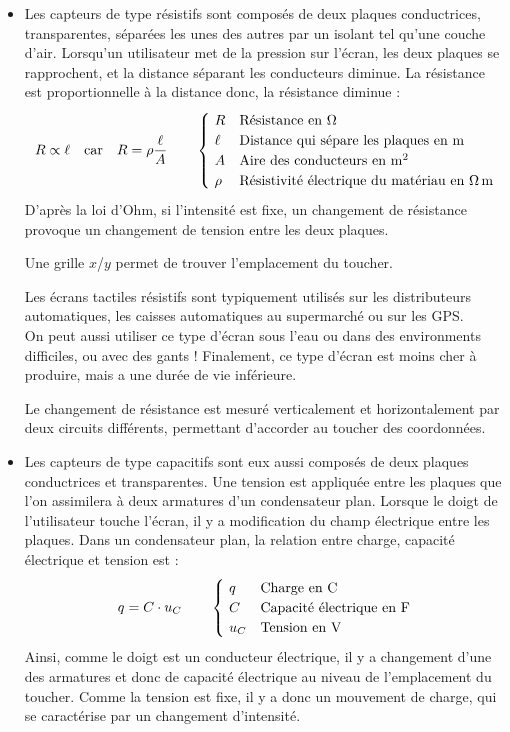 \documentclass[DIV=12]{scrartcl}
\begin{document}
   \begin{itemize}
        \item Les capteurs de type résistifs sont composés de deux plaques conductrices, transparentes, séparées les unes des autres par un isolant tel qu'une couche d'air.
        Lorsqu'un utilisateur met de la pression sur l'écran, les deux plaques se rapprochent, et la distance séparant les conducteurs diminue. La résistance est proportionnelle à la distance donc, la résistance diminue : \[R\propto\ell\quad\text{car}\quad R=\rho\frac{\ell}{A}\qquad\begin{cases}~R&\text{Résistance en \si{\ohm}}\\~\ell&\text{Distance qui sépare les plaques en \si{\metre}}\\~A&\text{Aire des conducteurs en \si{\metre\squared}}\\~\rho&\text{Résistivité électrique du matériau en \si{\ohm\meter}}\end{cases}\]
        D'après la loi d'Ohm, si l'intensité est fixe, un changement de résistance provoque  un changement de tension entre les deux plaques.

        Une grille $x$/$y$ permet de trouver l'emplacement du toucher.

        Les écrans tactiles résistifs sont typiquement utilisés sur les distributeurs automatiques, les caisses automatiques au supermarché ou sur les GPS. \\
        On peut aussi utiliser ce type d'écran sous l'eau ou dans des environments difficiles, ou avec des gants ! Finalement, ce type d'écran est moins cher à produire, mais a une durée de vie inférieure.     
       
        Le changement de résistance est mesuré verticalement et horizontalement par deux circuits différents, permettant d'accorder au toucher des coordonnées.

        \item Les capteurs de type capacitifs sont eux aussi composés de deux plaques conductrices et transparentes. Une tension est appliquée entre les plaques que l'on assimilera à deux armatures d'un condensateur plan. Lorsque le doigt de l'utilisateur touche l'écran, il y a modification du champ électrique entre les plaques. Dans un condensateur plan, la relation entre charge, capacité électrique et tension est : \[q=C\cdot u_C\qquad\begin{cases}~q&\text{Charge en \si{\coulomb}}\\~C&\text{Capacité électrique en \si{\farad}}\\~u_C&\text{Tension en \si{\volt}}\end{cases}\]
        Ainsi, comme le doigt est un conducteur électrique, il y a changement d'une des armatures et donc de capacité électrique au niveau de l'emplacement du toucher. Comme la tension est fixe, il y a donc un mouvement de charge, qui se caractérise par un changement d'intensité. 


\end{itemize}
\end{document}
